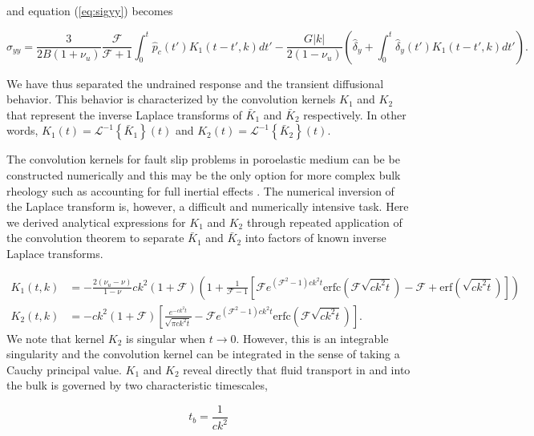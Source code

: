 \documentclass[draft]{agujournal2019}
\begin{document}
 and equation (\ref{eq:sigyy}) becomes
 
\begin{equation}
\hat{\sigma}_{yy} = \frac{3 }{2 B (1 + \nu_u)} \frac{  \mathcal{F} }{\mathcal{F} + 1} \int_0^t \hat{p}_c(t') K_1(t-t',k) dt' - \frac{G |k| }{2(1-\nu_u)} \left( \hat{\delta}_y + \int_0^t \hat{\delta}_y(t') K_1 (t - t',k) dt' \right).
\label{eq:sigyyIL}
\end{equation}

We have thus separated the undrained response and the transient diffusional behavior. This behavior is characterized by the convolution kernels $K_1$ and $K_2$ that represent the inverse Laplace transforms of $\bar{K}_1$ and $\bar{K}_2$ respectively. In other words, $K_1(t) =  \mathcal{L}^{-1} \left\{ \bar{K}_1 \right\} (t)$ and $K_2(t) =  \mathcal{L}^{-1} \left\{ \bar{K}_2 \right\} (t)$.

The convolution kernels for fault slip problems in poroelastic medium can be be constructed numerically and this may be the only option for more complex bulk rheology such as accounting for full inertial effects \cite{Heimisson2022spectral}. The numerical inversion of the Laplace transform is, however, a difficult and numerically intensive task. Here we derived analytical expressions for $K_1$ and $K_2$ through repeated application of the convolution theorem to separate $\bar{K}_1$ and $\bar{K}_2$ into factors of known inverse Laplace transforms.

\begin{align}
 K_1(t,k) & =  - \frac{2 (\nu_u - \nu)}{1-\nu} c k^2 (1 + \mathcal{F}) \left( 1 + \frac{1}{\mathcal{F} - 1} \left[ \mathcal{F} e^{ (\mathcal{F}^2-1)c k^2 t } \text{erfc}\left( \mathcal{F}\sqrt{c k^2 t } \right) - \mathcal{F}  + \text{erf} \left( \sqrt{c k^2 t } \right)  \right]   \right) \label{eq:K1}  \\ 
K_2(t,k) & =  - c k^2 (1 + \mathcal{F}) \left[ \frac{e^{-c k^2 t}}{\sqrt{\pi c k^2 t}} - \mathcal{F} e^{ (\mathcal{F}^2-1)c k^2 t } \text{erfc}\left( \mathcal{F}\sqrt{c k^2 t } \right)  \right]  \label{eq:K2}    .
\end{align}	
We note that kernel $K_2$ is singular when $t \rightarrow 0$. However, this is an integrable singularity and the convolution kernel can be integrated in the sense of taking a Cauchy principal value. $K_1$ and $K_2$ reveal directly that fluid transport in and into the bulk is governed by two characteristic timescales,

\begin{equation}
    t_{b} = \frac{1}{c k^2}
    \label{eq:tb}
\end{equation}
\end{document}
